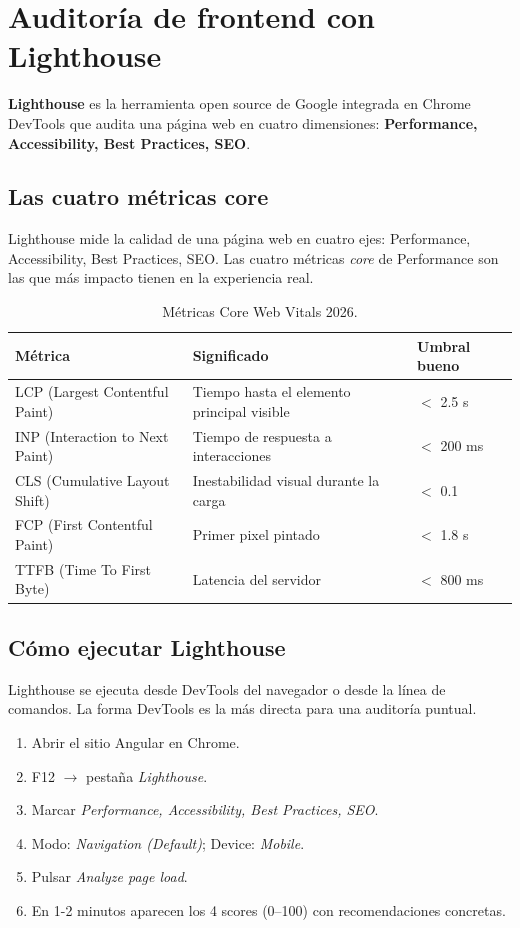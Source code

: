 \documentclass[11pt,a4paper,openany]{book}
\begin{document}
\section{Auditoría de frontend con Lighthouse}

\textbf{Lighthouse} es la herramienta open source de Google integrada
en Chrome DevTools que audita una página web en cuatro dimensiones:
\textbf{Performance, Accessibility, Best Practices, SEO}.

\subsection{Las cuatro métricas core}

Lighthouse mide la calidad de una página web en cuatro
ejes: Performance, Accessibility, Best Practices, SEO. Las cuatro
métricas \emph{core} de Performance son las que más impacto tienen
en la experiencia real.


\begin{table}[htbp]
\centering
\caption{Métricas Core Web Vitals 2026.}
\footnotesize
\begin{tabularx}{\textwidth}{lXl}
\toprule
\textbf{Métrica} & \textbf{Significado} & \textbf{Umbral bueno}\\
\midrule
LCP (Largest Contentful Paint) & Tiempo hasta el elemento principal visible & $<$ 2.5 s\\
INP (Interaction to Next Paint) & Tiempo de respuesta a interacciones & $<$ 200 ms\\
CLS (Cumulative Layout Shift) & Inestabilidad visual durante la carga & $<$ 0.1\\
FCP (First Contentful Paint) & Primer pixel pintado & $<$ 1.8 s\\
TTFB (Time To First Byte) & Latencia del servidor & $<$ 800 ms\\
\bottomrule
\end{tabularx}
\end{table}

\subsection{Cómo ejecutar Lighthouse}

Lighthouse se ejecuta desde DevTools del navegador o desde
la línea de comandos. La forma DevTools es la más directa para una
auditoría puntual.


\begin{enumerate}
\item Abrir el sitio Angular en Chrome.
\item F12 $\rightarrow$ pestaña \emph{Lighthouse}.
\item Marcar \emph{Performance, Accessibility, Best Practices, SEO}.
\item Modo: \emph{Navigation (Default)}; Device: \emph{Mobile}.
\item Pulsar \emph{Analyze page load}.
\item En 1-2 minutos aparecen los 4 scores (0--100) con
recomendaciones concretas.
\end{enumerate}
\end{document}
